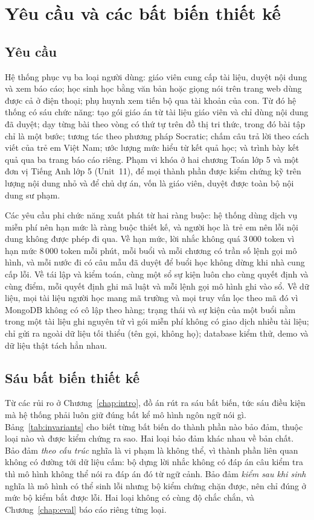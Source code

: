 \section{Yêu cầu và các bất biến thiết kế}\label{sec:nfr}

\subsection{Yêu cầu}
Hệ thống phục vụ ba loại người dùng: giáo viên cung cấp tài liệu, duyệt nội dung và xem báo cáo; học sinh học bằng văn bản hoặc giọng nói trên trang web dùng được cả ở điện thoại; phụ huynh xem tiến bộ qua tài khoản của con. Từ đó hệ thống có sáu chức năng: tạo gói giáo án từ tài liệu giáo viên và chỉ dùng nội dung đã duyệt; dạy từng bài theo vòng có thứ tự trên đồ thị tri thức, trong đó bài tập chỉ là một bước; tương tác theo phương pháp Socratic; chấm câu trả lời theo cách viết của trẻ em Việt Nam; ước lượng mức hiểu từ kết quả học; và trình bày kết quả qua ba trang báo cáo riêng. Phạm vi khóa ở hai chương Toán lớp 5 và một đơn vị Tiếng Anh lớp 5 (Unit~11), để mọi thành phần được kiểm chứng kỹ trên lượng nội dung nhỏ và để chủ dự án, vốn là giáo viên, duyệt được toàn bộ nội dung sư phạm.

Các yêu cầu phi chức năng xuất phát từ hai ràng buộc: hệ thống dùng dịch vụ miễn phí nên hạn mức là ràng buộc thiết kế, và người học là trẻ em nên lỗi nội dung không được phép đi qua. Về hạn mức, lời nhắc không quá $3\,000$ token vì hạn mức $8\,000$ token mỗi phút, mỗi buổi và mỗi chương có trần số lệnh gọi mô hình, và mỗi nước đi có câu mẫu đã duyệt để buổi học không dừng khi nhà cung cấp lỗi. Về tái lập và kiểm toán, cùng một sổ sự kiện luôn cho cùng quyết định và cùng điểm, mỗi quyết định ghi mã luật và mỗi lệnh gọi mô hình ghi vào sổ. Về dữ liệu, mọi tài liệu người học mang mã trường và mọi truy vấn lọc theo mã đó vì MongoDB không có cô lập theo hàng; trạng thái và sự kiện của một buổi nằm trong một tài liệu ghi nguyên tử vì gói miễn phí không có giao dịch nhiều tài liệu; chỉ gửi ra ngoài dữ liệu tối thiểu (tên gọi, không họ); database kiểm thử, demo và dữ liệu thật tách hẳn nhau.

\subsection{Sáu bất biến thiết kế}
Từ các rủi ro ở Chương~\ref{chap:intro}, đồ án rút ra sáu bất biến, tức sáu điều kiện mà hệ thống phải luôn giữ đúng bất kể mô hình ngôn ngữ nói gì. Bảng~\ref{tab:invariants} cho biết từng bất biến do thành phần nào bảo đảm, thuộc loại nào và được kiểm chứng ra sao. Hai loại bảo đảm khác nhau về bản chất. Bảo đảm \emph{theo cấu trúc} nghĩa là vi phạm là không thể, vì thành phần liên quan không có đường tới dữ liệu cấm: bộ dựng lời nhắc không có đáp án câu kiểm tra thì mô hình không thể nói ra đáp án đó từ ngữ cảnh. Bảo đảm \emph{kiểm sau khi sinh} nghĩa là mô hình có thể sinh lỗi nhưng bộ kiểm chứng chặn được, nên chỉ đúng ở mức bộ kiểm bắt được lỗi. Hai loại không có cùng độ chắc chắn, và Chương~\ref{chap:eval} báo cáo riêng từng loại.


